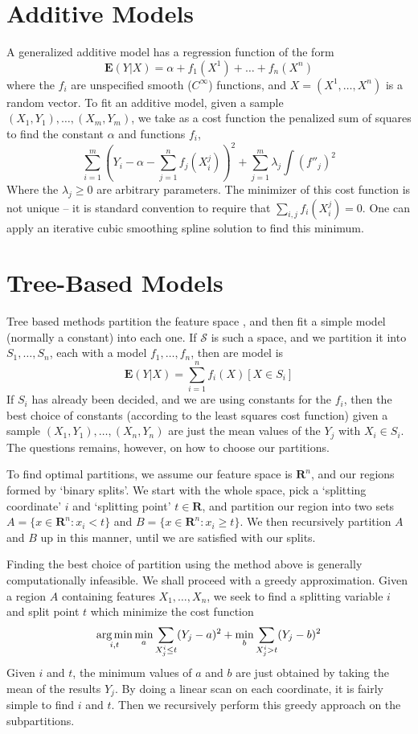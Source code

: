 \section{Additive Models}

A generalized additive model has a regression function of the form
%
\[ \mathbf{E}(Y|X) = \alpha + f_1(X^1) + \dots + f_n(X^n) \]
%
where the $f_i$ are unspecified smooth ($C^\infty$) functions, and $X = (X^1, \dots, X^n)$ is a random vector. To fit an additive model, given a sample $(X_1, Y_1), \dots, (X_m, Y_m)$, we take as a cost function the penalized sum of squares to find the constant $\alpha$ and functions $f_i$,
%
\[ \sum_{i = 1}^m \left( Y_i - \alpha - \sum_{j = 1}^n f_j(X_i^j) \right)^2 + \sum_{j = 1}^m \lambda_j \int (f''_j)^2 \]
%
Where the $\lambda_j \geq 0$ are arbitrary parameters. The minimizer of this cost function is not unique -- it is standard convention to require that $\sum_{i,j} f_i(X_i^j) = 0$. One can apply an iterative cubic smoothing spline solution to find this minimum.

\section{Tree-Based Models}

Tree based methods partition the feature space , and then fit a simple model (normally a constant) into each one. If $\mathcal{S}$ is such a space, and we partition it into $S_1, \dots, S_n$, each with a model $f_1, \dots, f_n$, then are model is
%
\[ \mathbf{E}(Y|X) = \sum_{i = 1}^n f_i(X) [X \in S_i] \]
%
If $S_i$ has already been decided, and we are using constants for the $f_i$, then the best choice of constants (according to the least squares cost function) given a sample $(X_1, Y_1), \dots, (X_n, Y_n)$ are just the mean values of the $Y_j$ with $X_i \in S_i$. The questions remains, however, on how to choose our partitions.

To find optimal partitions, we assume our feature space is $\mathbf{R}^n$, and our regions formed by `binary splits'. We start with the whole space, pick a `splitting coordinate' $i$ and `splitting point' $t \in \mathbf{R}$, and partition our region into two sets $A = \{ x \in \mathbf{R}^n : x_i < t \}$ and $B = \{ x \in \mathbf{R}^n : x_i \geq t \}$. We then recursively partition $A$ and $B$ up in this manner, until we are satisfied with our splits.

Finding the best choice of partition using the method above is generally computationally infeasible. We shall proceed with a greedy approximation. Given a region $A$ containing features $X_1, \dots, X_n$, we seek to find a splitting variable $i$ and split point $t$ which minimize the cost function
%
\[ \operatorname*{arg\,min}_{i,t} \min_a \sum_{X_j^i \leq t} (Y_j - a)^2 + \min_b \sum_{X_j^i > t} (Y_j - b)^2 \]
%
Given $i$ and $t$, the minimum values of $a$ and $b$ are just obtained by taking the mean of the results $Y_j$. By doing a linear scan on each coordinate, it is fairly simple to find $i$ and $t$. Then we recursively perform this greedy approach on the subpartitions.

